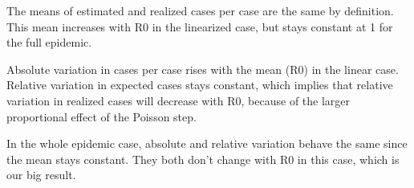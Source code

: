 The means of estimated and realized cases per case are the same by definition. This mean increases with R0 in the linearized case, but stays constant at 1 for the full epidemic. 

Absolute variation in cases per case rises with the mean (R0) in the linear case. Relative variation in expected cases stays constant, which implies that relative variation in realized cases will decrease with R0, because of the larger proportional effect of the Poisson step.

In the whole epidemic case, absolute and relative variation behave the same since the mean stays constant. They both don't change with R0 in this case, which is our big result.

